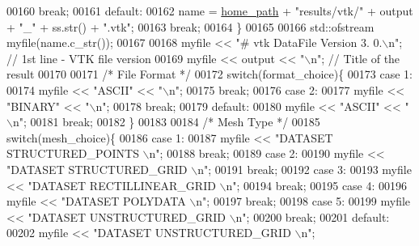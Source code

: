 \begin{DoxyCode}
00160         \textcolor{keywordflow}{break};
00161     \textcolor{keywordflow}{default}:
00162         name = \hyperlink{_global_variables_8h_a556ce46e457f991c51f3dac111579e2b}{home\_path} + \textcolor{stringliteral}{"results/vtk/"} + output + \textcolor{stringliteral}{"\_"} + ss.str() + \textcolor{stringliteral}{".vtk"};
00163         \textcolor{keywordflow}{break};
00164     \}
00165 
00166     std::ofstream myfile(name.c\_str());
00167 
00168     myfile << \textcolor{stringliteral}{"# vtk DataFile Version 3. 0.\(\backslash\)n"}; \textcolor{comment}{// 1st line - VTK file version}
00169     myfile << output << \textcolor{stringliteral}{"\(\backslash\)n"}; \textcolor{comment}{// Title of the result}
00170 
00171     \textcolor{comment}{/* File Format */}
00172     \textcolor{keywordflow}{switch}(format\_choice)\{
00173     \textcolor{keywordflow}{case} 1:
00174         myfile << \textcolor{stringliteral}{"ASCII"} << \textcolor{stringliteral}{"\(\backslash\)n"};
00175         \textcolor{keywordflow}{break};
00176     \textcolor{keywordflow}{case} 2:
00177         myfile << \textcolor{stringliteral}{"BINARY"} << \textcolor{stringliteral}{"\(\backslash\)n"};
00178         \textcolor{keywordflow}{break};
00179     \textcolor{keywordflow}{default}:
00180         myfile << \textcolor{stringliteral}{"ASCII"} << \textcolor{stringliteral}{"\(\backslash\)n"};
00181         \textcolor{keywordflow}{break};
00182     \}
00183 
00184     \textcolor{comment}{/* Mesh Type */}
00185     \textcolor{keywordflow}{switch}(mesh\_choice)\{
00186     \textcolor{keywordflow}{case} 1:
00187         myfile << \textcolor{stringliteral}{"DATASET STRUCTURED\_POINTS \(\backslash\)n"};
00188         \textcolor{keywordflow}{break};
00189     \textcolor{keywordflow}{case} 2:
00190         myfile << \textcolor{stringliteral}{"DATASET STRUCTURED\_GRID \(\backslash\)n"};
00191         \textcolor{keywordflow}{break};
00192     \textcolor{keywordflow}{case} 3:
00193         myfile << \textcolor{stringliteral}{"DATASET RECTILLINEAR\_GRID \(\backslash\)n"};
00194         \textcolor{keywordflow}{break};
00195     \textcolor{keywordflow}{case} 4:
00196         myfile << \textcolor{stringliteral}{"DATASET POLYDATA \(\backslash\)n"};
00197         \textcolor{keywordflow}{break};
00198     \textcolor{keywordflow}{case} 5:
00199         myfile << \textcolor{stringliteral}{"DATASET UNSTRUCTURED\_GRID \(\backslash\)n"};
00200         \textcolor{keywordflow}{break};
00201     \textcolor{keywordflow}{default}:
00202         myfile << \textcolor{stringliteral}{"DATASET UNSTRUCTURED\_GRID \(\backslash\)n"};

\end{DoxyCode}
